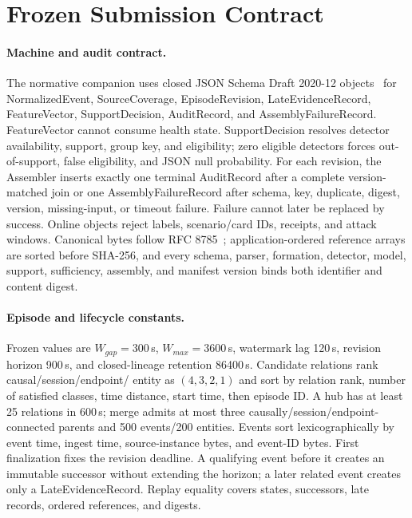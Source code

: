 \appendix

\section{Frozen Submission Contract}
\label{app:frozen-contract}
\begingroup\small

\paragraph{Machine and audit contract.}
The normative companion uses closed JSON Schema Draft 2020-12
objects~\cite{jsonschema2020} for NormalizedEvent, SourceCoverage, EpisodeRevision,
LateEvidenceRecord, FeatureVector, SupportDecision, AuditRecord, and AssemblyFailureRecord.
FeatureVector cannot consume health state. SupportDecision resolves detector availability,
support, group key, and eligibility; zero eligible detectors forces out-of-support, false
eligibility, and JSON null probability. For each revision, the Assembler inserts exactly one
terminal AuditRecord after a complete version-matched join or one AssemblyFailureRecord after
schema, key, duplicate, digest, version, missing-input, or timeout failure. Failure cannot later
be replaced by success. Online objects reject labels, scenario/card IDs, receipts, and attack
windows. Canonical bytes follow RFC 8785~\cite{rfc8785}; application-ordered reference arrays are
sorted before SHA-256, and every schema, parser, formation, detector, model, support, sufficiency,
assembly, and manifest version binds both identifier and content digest.

\paragraph{Episode and lifecycle constants.}
Frozen values are $W_{gap}=300$\,s, $W_{max}=3600$\,s, watermark lag 120\,s, revision horizon
900\,s, and closed-lineage retention 86400\,s. Candidate relations rank causal/session/endpoint/
entity as $(4,3,2,1)$ and sort by relation rank, number of satisfied classes, time distance,
start time, then episode ID. A hub has at least 25 relations in 600\,s; merge admits at most
three causally/session/endpoint-connected parents and 500 events/200 entities. Events sort
lexicographically by event time, ingest time, source-instance bytes, and event-ID bytes. First finalization fixes
the revision deadline. A qualifying event before it creates an immutable successor without
extending the horizon; a later related event creates only a LateEvidenceRecord. Replay equality
covers states, successors, late records, ordered references, and digests.

